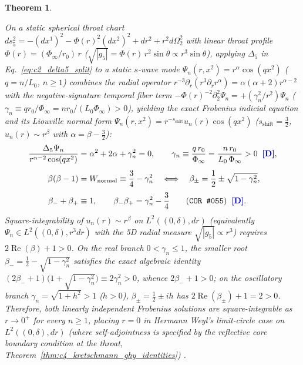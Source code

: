 \documentclass[11pt,a4paper]{article}
\newcommand{\catD}{\text{\textbf{\textcolor{blue!75!black}{[D]}}}}
\theoremstyle{definition}
\theoremstyle{plain}
\newtheorem{theorem}[axiom]{Theorem}
\theoremstyle{remark}
\begin{document}
\begin{theorem}
\begin{enumerate}[label=(\roman*)]
  On a static spherical throat chart $ds_5^2 = -(dx^1)^2 - \Phi(r)^2(dx^2)^2 + dr^2 + r^2 d\Omega_2^2$ with linear throat profile $\Phi(r) = (\Phi_\infty/r_0)\,r$ ($\sqrt{|g_5|} = \Phi(r)\,r^2\sin\theta \propto r^3\sin\theta$), applying $\Delta_5$ in Eq.~\eqref{eq:c2_delta5_split} to a static $s$-wave mode $\Psi_n(r, x^2) = r^\alpha\cos(q x^2)$ ($q = n/L_0$, $n \ge 1$) combines the radial operator $r^{-3}\partial_r(r^3\partial_r r^\alpha) = \alpha(\alpha + 2)r^{\alpha - 2}$ with the negative-signature temporal fiber term $-\Phi(r)^{-2}\partial_2^2\Psi_n = +(\gamma_n^2/r^2)\Psi_n$ ($\gamma_n \equiv q r_0/\Phi_\infty = n r_0/(L_0\Phi_\infty) > 0$), yielding the exact Frobenius indicial equation and its Liouville normal form $\Psi_n(r, x^2) = r^{-s_{\mathrm{shift}}}u_n(r)\cos(q x^2)$ ($s_{\mathrm{shift}} = \frac{3}{2}$, $u_n(r) \sim r^\beta$ with $\alpha = \beta - \frac{3}{2}$):
  \begin{align}
  \frac{\Delta_5\Psi_n}{r^{\alpha - 2}\cos(q x^2)} &= \alpha^2 + 2\alpha + \gamma_n^2 = 0, \qquad
  \gamma_n \equiv \frac{q\,r_0}{\Phi_\infty} = \frac{n\,r_0}{L_0\,\Phi_\infty} > 0 \;\;\catD, \nonumber \\[4pt]
  \beta(\beta - 1) &= W_{\mathrm{normal}} \equiv \frac{3}{4} - \gamma_n^2 \quad \Longleftrightarrow \quad
  \beta_\pm = \frac{1}{2} \pm \sqrt{1 - \gamma_n^2}, \nonumber \\[3pt]
  \beta_- + \beta_+ &\equiv 1, \qquad
  \beta_-\beta_+ = \gamma_n^2 - \frac{3}{4} \qquad \textnormal{(\texttt{COR~\#055})} \;\;\catD. \label{eq:c2_weyl_barrier}
  \end{align}
  Square-integrability of $u_n(r) \sim r^\beta$ on $L^2((0, \delta), dr)$ (equivalently $\Psi_n \in L^2((0, \delta), r^3 dr)$ with the 5D radial measure $\sqrt{|g_5|} \propto r^3$) requires $2\operatorname{Re}(\beta) + 1 > 0$. On the real branch $0 < \gamma_n \le 1$, the smaller root $\beta_- = \frac{1}{2} - \sqrt{1 - \gamma_n^2}$ satisfies the exact algebraic identity $(2\beta_- + 1)\big(1 + \sqrt{1 - \gamma_n^2}\big) \equiv 2\gamma_n^2 > 0$, whence $2\beta_- + 1 > 0$; on the oscillatory branch $\gamma_n = \sqrt{1 + h^2} > 1$ ($h > 0$), $\beta_\pm = \frac{1}{2} \pm i h$ has $2\operatorname{Re}(\beta_\pm) + 1 = 2 > 0$. Therefore, both linearly independent Frobenius solutions are square-integrable as $r \to 0^+$ for every $n \ge 1$, placing $r = 0$ in Hermann Weyl's \emph{limit-circle} case on $L^2((0, \delta), dr)$ (where self-adjointness is specified by the reflective core boundary condition at the throat, Theorem~\ref{thm:c4_kretschmann_ghy_identities}) \catD.
\end{enumerate}
\end{theorem}
\end{document}
